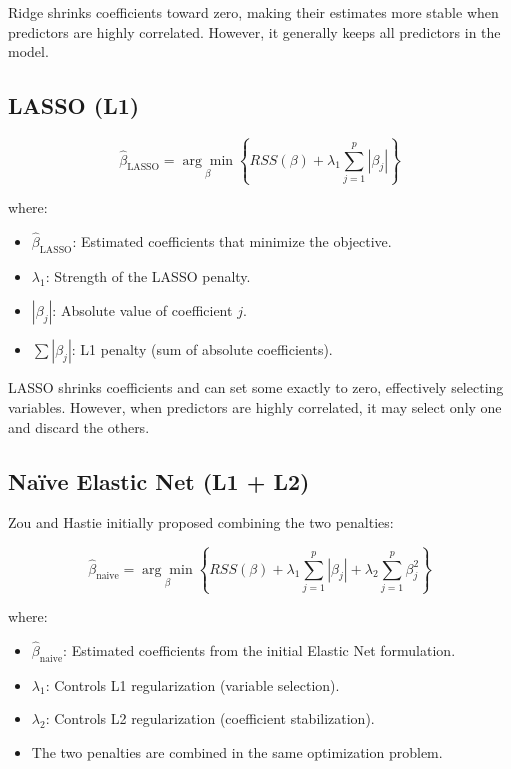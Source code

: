 \documentclass[
  letterpaper,
  DIV=11,
  numbers=noendperiod]{scrreprt}
\providecommand{\tightlist}{%
  \setlength{\itemsep}{0pt}\setlength{\parskip}{0pt}}
\begin{document}
Ridge shrinks coefficients toward zero, making their estimates more
stable when predictors are highly correlated. However, it generally
keeps all predictors in the model.

\subsection{LASSO (L1)}\label{lasso-l1}

\[
\hat{\beta}_{\text{LASSO}}
=\underset{\beta}{\arg\min}
\left\{
RSS(\beta)+\lambda_1\sum_{j=1}^{p}|\beta_j|
\right\}
\]

where:

\begin{itemize}
\tightlist
\item
  \(\hat{\beta}_{\text{LASSO}}\): Estimated coefficients that minimize
  the objective.
\item
  \(\lambda_1\): Strength of the LASSO penalty.
\item
  \(|\beta_j|\): Absolute value of coefficient \(j\).
\item
  \(\sum|\beta_j|\): L1 penalty (sum of absolute coefficients).
\end{itemize}

LASSO shrinks coefficients and can set some exactly to zero, effectively
selecting variables. However, when predictors are highly correlated, it
may select only one and discard the others.

\subsection{Naïve Elastic Net (L1 +
L2)}\label{nauxefve-elastic-net-l1-l2}

Zou and Hastie initially proposed combining the two penalties:

\[
\hat{\beta}_{\text{naive}}
=\underset{\beta}{\arg\min}
\left\{
RSS(\beta)
+\lambda_1\sum_{j=1}^{p}|\beta_j|
+\lambda_2\sum_{j=1}^{p}\beta_j^2
\right\}
\]

where:

\begin{itemize}
\tightlist
\item
  \(\hat{\beta}_{\text{naive}}\): Estimated coefficients from the
  initial Elastic Net formulation.
\item
  \(\lambda_1\): Controls L1 regularization (variable selection).
\item
  \(\lambda_2\): Controls L2 regularization (coefficient stabilization).
\item
  The two penalties are combined in the same optimization problem.
\end{itemize}
\end{document}
